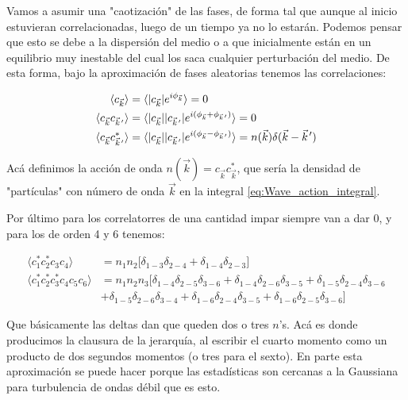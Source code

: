 Vamos a asumir una "caotización" de las fases, de forma tal que aunque al inicio estuvieran correlacionadas, luego de un tiempo ya no lo estarán. Podemos pensar que esto se debe a la dispersión del medio o a que inicialmente están en un equilibrio muy inestable del cual los saca cualquier perturbación del medio. De esta forma, bajo la aproximación de fases aleatorias tenemos las correlaciones:

\begin{equation}
	\begin{split}
		\langle c_{\vec k}\rangle &= \langle |c_{\vec k}|e^{i\phi_{\vec k}}	 \rangle = 0 \\
		\langle c_{\vec k} c_{\pvec k'} \rangle &= \langle |c_{\vec k}||c_{\pvec k'}| e^{i(\phi_{\vec k}+\phi_{\pvec k'})} \rangle = 0 \\
		\langle c_{\vec k} c^*_{\pvec k'} \rangle  &= \langle |c_{\vec k}||c_{\pvec k'}| e^{i(\phi_{\vec k}-\phi_{\pvec k'})} \rangle = n(\vec k) \delta(\vec k - \pvec k')
	\end{split}
\end{equation} 

Acá definimos la acción de onda $n(\vec k) = c_{\vec k}c^*_{\vec k}$, que sería la densidad de "partículas" con número de onda $\vec k$ en la integral \eqref{eq:Wave_action_integral}.  

Por último para los correlatorres de una cantidad impar siempre van a dar 0, y para los de orden 4 y 6 tenemos:

\begin{equation}
	\begin{split}
		\langle	c_1^*c_2^*c_3c_4 \rangle & = n_1 n_2 \big[\delta_{1-3}\delta_{2-4} + \delta_{1-4}\delta_{2-3}\big] \\ 
		\langle c_1^*c_2^*c_3^*c_4c_5c_6 \rangle &= n_1n_2n_3\big[  \delta_{1-4}\delta_{2-5}\delta_{3-6} + \delta_{1-4}\delta_{2-6}\delta_{3-5} + \delta_{1-5}\delta_{2-4}\delta_{3-6} \\ 
		& +\delta_{1-5}\delta_{2-6}\delta_{3-4} + \delta_{1-6}\delta_{2-4}\delta_{3-5} + \delta_{1-6}\delta_{2-5}\delta_{3-6} \big] 
	\end{split}
\end{equation}

Que básicamente las deltas dan que queden dos o tres  $n$'s. Acá es donde producimos la clausura de la jerarquía, al escribir el cuarto momento como un producto de dos segundos momentos (o tres para el sexto). En parte esta aproximación se puede hacer porque las estadísticas son cercanas a la Gaussiana para turbulencia de ondas débil que es esto. \cite{falkovichTurbulence2006} 

